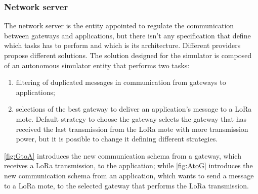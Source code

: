 \subsubsection{Network server}
The network server is the entity appointed to regulate the communication between gateways and applications, but there isn't any specification that define which tasks has to perform and which is its architecture. 
Different providers propose different solutions. 
The solution designed for the simulator is composed of an autonomous simulator entity that performs two tasks:
\begin{enumerate}
    \item filtering of duplicated messages in communication from gateways to applications;
    \item selections of the best gateway to deliver an application's message to a LoRa mote. 
    Default strategy to choose the gateway selects the gateway that has received the last transmission from the LoRa mote with more transmission power, but it is possible to change it defining different strategies. 
\end{enumerate}
\autoref{fig:GtoA} introduces the new communication schema from a gateway, which receives a LoRa transmission, to the application; while \autoref{fig:AtoG} introduces the new communication schema from an application, which wants to send a message to a LoRa mote, to the selected gateway that performs the LoRa transmission.
